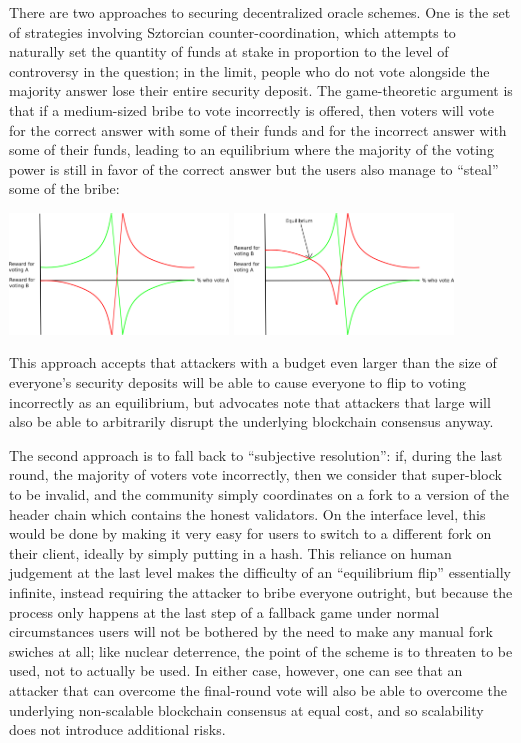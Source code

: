 \documentclass[11pt,a4paper]{report}
\theoremstyle{plain}
\theoremstyle{definition}
\theoremstyle{remark}
\begin{document}
There are two approaches to securing decentralized oracle schemes. One is the set of strategies involving Sztorcian counter-coordination, which attempts to naturally set the quantity of funds at stake in proportion to the level of controversy in the question; in the limit, people who do not vote alongside the majority answer lose their entire security deposit. The game-theoretic argument is that if a medium-sized bribe to vote incorrectly is offered, then voters will vote for the correct answer with some of their funds and for the incorrect answer with some of their funds, leading to an equilibrium where the majority of the voting power is still in favor of the correct answer but the users also manage to ``steal'' some of the bribe:

\begin{center}
\includegraphics[width=165pt]{schellingcoin_payoff1.png}
\includegraphics[width=165pt]{schellingcoin_payoff2.png}
\end{center}


This approach accepts that attackers with a budget even larger than the size of everyone's security deposits will be able to cause everyone to flip to voting incorrectly as an equilibrium, but advocates note that attackers that large will also be able to arbitrarily disrupt the underlying blockchain consensus anyway.

The second approach is to fall back to ``subjective resolution'': if, during the last round, the majority of voters vote incorrectly, then we consider that super-block to be invalid, and the community simply coordinates on a fork to a version of the header chain which contains the honest validators. On the interface level, this would be done by making it very easy for users to switch to a different fork on their client, ideally by simply putting in a hash. This reliance on human judgement at the last level makes the difficulty of an ``equilibrium flip'' essentially infinite, instead requiring the attacker to bribe everyone outright, but because the process only happens at the last step of a fallback game under normal circumstances users will not be bothered by the need to make any manual fork swiches at all; like nuclear deterrence, the point of the scheme is to threaten to be used, not to actually be used. In either case, however, one can see that an attacker that can overcome the final-round vote will also be able to overcome the underlying non-scalable blockchain consensus at equal cost, and so scalability does not introduce additional risks.
\end{document}
